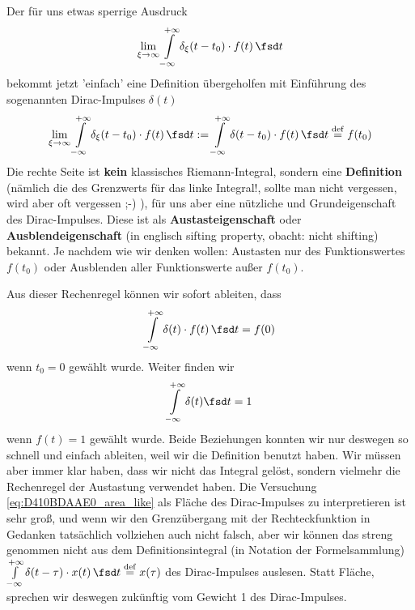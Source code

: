 \begin{Werkzeug}
%
Der für uns etwas sperrige Ausdruck
\begin{equation}
\lim_{\xi\to\infty} \int\limits_{-\infty}^{+\infty}
\delta_\xi(t-t_0) \cdot f(t) \, \fsd t
\end{equation}
bekommt jetzt 'einfach' eine Definition übergeholfen mit
Einführung des sogenannten Dirac-Impulses $\delta(t)$
\begin{equation}
\label{eq:DiracDistrDef}
\lim_{\xi\to\infty} \int\limits_{-\infty}^{+\infty}
\delta_\xi(t-t_0) \cdot f(t) \, \fsd t
:= \int\limits_{-\infty}^{+\infty} \delta(t-t_0) \cdot f(t) \, \fsd t \stackrel{\mathrm{def}}= f(t_0)
\end{equation}
%
Die rechte Seite ist \textbf{kein} klassisches Riemann-Integral, sondern eine
\textbf{Definition} (nämlich die des Grenzwerts für das linke Integral!,
sollte man nicht vergessen, wird aber oft vergessen ;-) ),
für uns aber eine nützliche  und Grundeigenschaft des
Dirac-Impulses. Diese ist als \textbf{Austasteigenschaft} oder
\textbf{Ausblendeigenschaft} (in englisch sifting property, obacht: nicht shifting)
bekannt. Je nachdem wie wir denken wollen:
Austasten nur des Funktionswertes $f(t_0)$ oder Ausblenden aller Funktionswerte
außer $f(t_0)$.

Aus dieser Rechenregel können wir sofort ableiten, dass
\begin{equation}
\label{}
\int\limits_{-\infty}^{+\infty} \delta(t) \cdot f(t) \, \fsd t = f(0)
\end{equation}
wenn $t_0=0$ gewählt wurde.
%
Weiter finden wir
\begin{equation}
\label{eq:D410BDAAE0_area_like}
\int\limits_{-\infty}^{+\infty} \delta(t) \fsd t = 1
\end{equation}
wenn $f(t)=1$ gewählt wurde.
%
Beide Beziehungen konnten wir nur deswegen so schnell und einfach ableiten, weil
wir die Definition benutzt haben. Wir müssen aber immer klar haben, dass wir
nicht das Integral gelöst, sondern vielmehr die Rechenregel der Austastung
verwendet haben.
%
Die Versuchung \eqref{eq:D410BDAAE0_area_like} als Fläche
des Dirac-Impulses zu interpretieren
ist sehr groß, und wenn wir den Grenzübergang mit der Rechteckfunktion in Gedanken
tatsächlich vollziehen auch nicht falsch, aber wir können das streng genommen
nicht aus dem Definitionsintegral (in Notation der Formelsammlung)
$\int\limits_{-\infty}^{+\infty} \delta(t-\tau) \cdot x(t) \, \fsd t \stackrel{\mathrm{def}}= x(\tau)$
des Dirac-Impulses auslesen.
%
Statt Fläche, sprechen wir deswegen zukünftig vom Gewicht 1 des Dirac-Impulses.

\end{Werkzeug}

